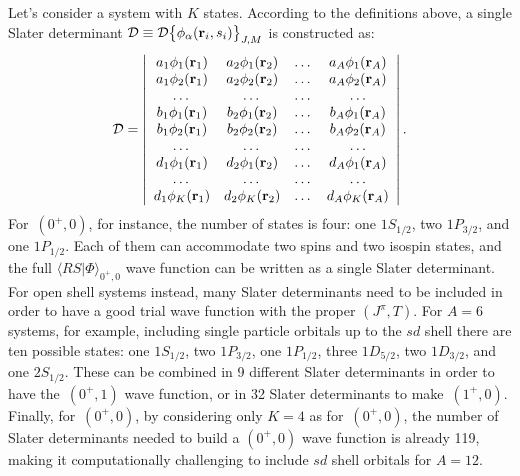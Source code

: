 \documentclass[aps,prc,twocolumn,superscriptaddress,floatfix]{revtex4-1}
\begin{document}
Let's consider a system with $K$ states. According to the definitions above, 
a single Slater determinant $\mathcal D\equiv\mathcal D\big\{\phi_\alpha(\vb{r}_i,s_i)\big\}_{J,M}$ is constructed as:
\begin{align}
\mathcal D=
\left|
\begin{array}{cccc}
a_1\phi_1(\vb{r}_1) & a_2\phi_1(\vb{r}_2) & \dots & a_A\phi_1(\vb{r}_A) \\
a_1\phi_2(\vb{r}_1) & a_2\phi_2(\vb{r}_2) & \dots & a_A\phi_2(\vb{r}_A) \\
\dots & \dots & \dots & \dots \\
b_1\phi_1(\vb{r}_1) & b_2\phi_1(\vb{r}_2) & \dots & b_A\phi_1(\vb{r}_A) \\
b_1\phi_2(\vb{r}_1) & b_2\phi_2(\vb{r}_2) & \dots & b_A\phi_2(\vb{r}_A) \\
\dots & \dots & \dots & \dots \\
d_1\phi_1(\vb{r}_1) & d_2\phi_1(\vb{r}_2) & \dots & d_A\phi_1(\vb{r}_A) \\
\dots & \dots & \dots & \dots \\
d_1\phi_K(\vb{r}_1) & d_2\phi_K(\vb{r}_2) & \dots & d_A\phi_K(\vb{r}_A) \\
\end{array}
\right| . 
\end{align}
For \,$(0^+,0)$, for instance, the number of states is four: 
one $1S_{1/2}$, two $1P_{3/2}$, and one $1P_{1/2}$. Each of them
can accommodate two spins and two isospin states, and the full 
$\langle RS|\Phi\rangle_{0^+,0}$
wave function can be written as a single Slater determinant. 
For open shell systems instead, many Slater determinants need to be 
included in order to have a good trial wave function with the proper $(J^\pi,T)$.
For $A=6$ systems, for example, including single particle orbitals up to the 
$sd$ shell there are ten possible states: 
one $1S_{1/2}$, two $1P_{3/2}$, one $1P_{1/2}$, three $1D_{5/2}$, 
two $1D_{3/2}$, and one $2S_{1/2}$. These can be combined in 9
different Slater determinants in order to have the \,$(0^+,1)$ wave function, 
or in 32 Slater determinants to make \,$(1^+,0)$. 
Finally, for \,$(0^+,0)$, by considering only $K=4$ as for 
\,$(0^+,0)$, the number of Slater determinants needed to build a $(0^+,0)$ 
wave function is already 119, making it computationally challenging to include $sd$ shell orbitals for $A=12$.
\end{document}
